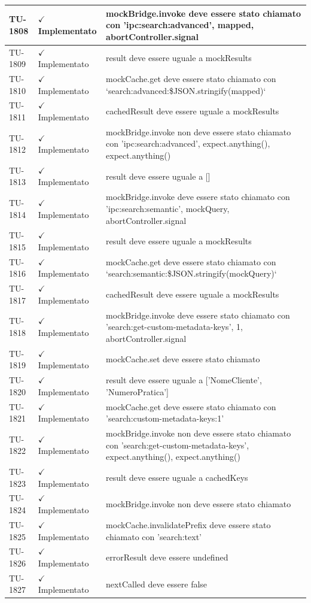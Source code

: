 ﻿\documentclass[a4paper,12pt]{article}
\newcommand{\ok}{\textcolor{green!60!black}{$\checkmark$ Implementato}}
\begin{document}
\begin{longtable}{|p{2cm}|p{3.5cm}|p{9.5cm}|}
\hline
TU-1808 & \ok & mockBridge.invoke deve essere stato chiamato con 'ipc:search:advanced', mapped, abortController.signal \\
\hline
TU-1809 & \ok & result deve essere uguale a mockResults \\
\hline
TU-1810 & \ok & mockCache.get deve essere stato chiamato con `search:advanced:\${JSON.stringify(mapped)}` \\
\hline
TU-1811 & \ok & cachedResult deve essere uguale a mockResults \\
\hline
TU-1812 & \ok & mockBridge.invoke non deve essere stato chiamato con 'ipc:search:advanced', expect.anything(), expect.anything() \\
\hline
TU-1813 & \ok & result deve essere uguale a [] \\
\hline
TU-1814 & \ok & mockBridge.invoke deve essere stato chiamato con 'ipc:search:semantic', mockQuery, abortController.signal \\
\hline
TU-1815 & \ok & result deve essere uguale a mockResults \\
\hline
TU-1816 & \ok & mockCache.get deve essere stato chiamato con `search:semantic:\${JSON.stringify(mockQuery)}` \\
\hline
TU-1817 & \ok & cachedResult deve essere uguale a mockResults \\
\hline
TU-1818 & \ok & mockBridge.invoke deve essere stato chiamato con 'search:get-custom-metadata-keys', 1, abortController.signal \\
\hline
TU-1819 & \ok & mockCache.set deve essere stato chiamato \\
\hline
TU-1820 & \ok & result deve essere uguale a ['NomeCliente', 'NumeroPratica'] \\
\hline
TU-1821 & \ok & mockCache.get deve essere stato chiamato con 'search:custom-metadata-keys:1' \\
\hline
TU-1822 & \ok & mockBridge.invoke non deve essere stato chiamato con 'search:get-custom-metadata-keys', expect.anything(), expect.anything() \\
\hline
TU-1823 & \ok & result deve essere uguale a cachedKeys \\
\hline
TU-1824 & \ok & mockBridge.invoke non deve essere stato chiamato \\
\hline
TU-1825 & \ok & mockCache.invalidatePrefix deve essere stato chiamato con 'search:text' \\
\hline
TU-1826 & \ok & errorResult deve essere undefined \\
\hline
TU-1827 & \ok & nextCalled deve essere false \\

\end{longtable}
\end{document}
